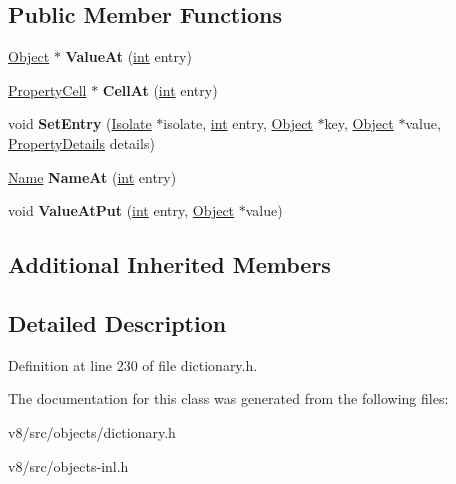 \subsection*{Public Member Functions}
\begin{DoxyCompactItemize}
\item 
\mbox{\label{classv8_1_1internal_1_1GlobalDictionary_acd8ac3d913a9884247e781d906da4116}} 
\mbox{\hyperlink{classv8_1_1internal_1_1Object}{Object}} $\ast$ {\bfseries Value\+At} (\mbox{\hyperlink{classint}{int}} entry)
\item 
\mbox{\label{classv8_1_1internal_1_1GlobalDictionary_ad28d1f5c74c6a37de24048ff9146c304}} 
\mbox{\hyperlink{classv8_1_1internal_1_1PropertyCell}{Property\+Cell}} $\ast$ {\bfseries Cell\+At} (\mbox{\hyperlink{classint}{int}} entry)
\item 
\mbox{\label{classv8_1_1internal_1_1GlobalDictionary_a1b48bab3312bb72eaaba6ca5235b14ae}} 
void {\bfseries Set\+Entry} (\mbox{\hyperlink{classv8_1_1internal_1_1Isolate}{Isolate}} $\ast$isolate, \mbox{\hyperlink{classint}{int}} entry, \mbox{\hyperlink{classv8_1_1internal_1_1Object}{Object}} $\ast$key, \mbox{\hyperlink{classv8_1_1internal_1_1Object}{Object}} $\ast$value, \mbox{\hyperlink{classv8_1_1internal_1_1PropertyDetails}{Property\+Details}} details)
\item 
\mbox{\label{classv8_1_1internal_1_1GlobalDictionary_ac9ea7fbb018e6ff74e9d53f848cc58d8}} 
\mbox{\hyperlink{classv8_1_1internal_1_1Name}{Name}} {\bfseries Name\+At} (\mbox{\hyperlink{classint}{int}} entry)
\item 
\mbox{\label{classv8_1_1internal_1_1GlobalDictionary_abb9550f9d3ae9d9b7a0f5a0868885b91}} 
void {\bfseries Value\+At\+Put} (\mbox{\hyperlink{classint}{int}} entry, \mbox{\hyperlink{classv8_1_1internal_1_1Object}{Object}} $\ast$value)
\end{DoxyCompactItemize}
\subsection*{Additional Inherited Members}


\subsection{Detailed Description}


Definition at line 230 of file dictionary.\+h.



The documentation for this class was generated from the following files\+:\begin{DoxyCompactItemize}
\item 
v8/src/objects/dictionary.\+h\item 
v8/src/objects-\/inl.\+h\end{DoxyCompactItemize}
